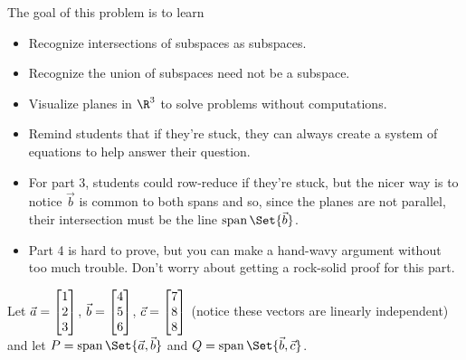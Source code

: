 \documentclass{problemset}
\newcommand{\bookonlynewpage}{\begin{bookonly}\newpage\end{bookonly}}
\begin{document}
	\bookonlynewpage
	\question
	\begin{annotation}
		\begin{goals}

			The goal of this problem is to learn
			\begin{itemize}
				\item Recognize intersections of subspaces as subspaces.
				\item Recognize the union of subspaces need not be a subspace.
				\item Visualize planes in $\R^3$ to solve problems without computations.
			\end{itemize}
		\end{goals}

		\begin{notes}
			\begin{itemize}
				\item Remind students that if they're stuck, they can always create a system
					of equations to help answer their question.
				\item For part 3, students could row-reduce if they're stuck, but the nicer
					way is to notice $\vec b$ is common to both spans and so, since the
					planes are not parallel, their intersection must be the line $\Span\Set{\vec b}$.
				\item Part 4 is hard to prove, but you can make a hand-wavy argument without
					too much trouble. Don't worry about getting a rock-solid proof for this part.
			\end{itemize}
		\end{notes}
	\end{annotation}
	Let $\vec a=\mat{1\\2\\3}$, $\vec b=\mat{4\\5\\6}$, $\vec c=\mat{7\\8\\8}$ (notice these vectors
	are linearly independent) and
	let $P=\Span\Set{\vec a,\vec b}$ and $Q=\Span\Set{\vec b,\vec c}$.
\end{document}
